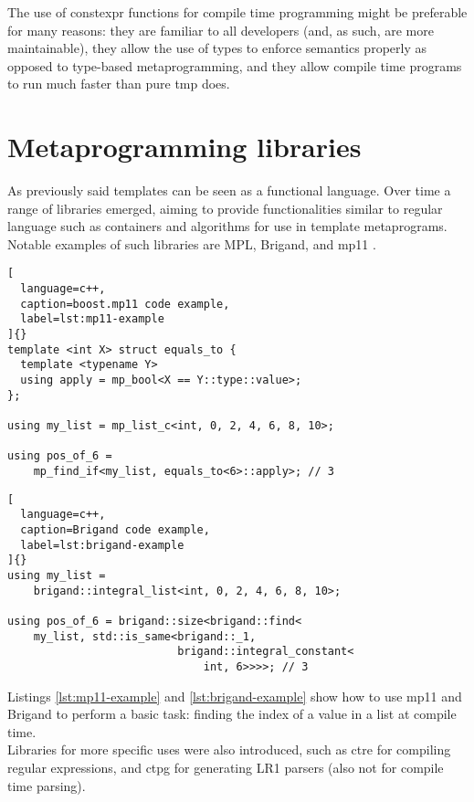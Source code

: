 \documentclass[../main]{subfiles}
\begin{document}
The use of \gls{constexpr} functions for compile time programming might be
preferable for many reasons: they are familiar to all \cpp developers
(and, as such, are more maintainable), they allow the use of types to enforce
semantics properly as opposed to type-based metaprogramming, and they allow
compile time programs to run much faster than pure \gls{tmp} does.

\section{
  Metaprogramming libraries
}
\label{lbl:meta-libraries}

As previously said \cpp templates can be seen as a functional language.
Over time a range of libraries emerged, aiming to provide functionalities
similar to regular language such as containers and algorithms for use in
template metaprograms. Notable examples of such libraries are MPL\cite{mpl},
Brigand\cite{brigand}, and mp11 \cite{mp11}.

\begin{lstlisting}[
  language=c++,
  caption=boost.mp11 code example,
  label=lst:mp11-example
]{}
template <int X> struct equals_to {
  template <typename Y>
  using apply = mp_bool<X == Y::type::value>;
};

using my_list = mp_list_c<int, 0, 2, 4, 6, 8, 10>;

using pos_of_6 =
    mp_find_if<my_list, equals_to<6>::apply>; // 3
\end{lstlisting}

\begin{lstlisting}[
  language=c++,
  caption=Brigand code example,
  label=lst:brigand-example
]{}
using my_list =
    brigand::integral_list<int, 0, 2, 4, 6, 8, 10>;

using pos_of_6 = brigand::size<brigand::find<
    my_list, std::is_same<brigand::_1,
                          brigand::integral_constant<
                              int, 6>>>>; // 3
\end{lstlisting}

Listings \ref{lst:mp11-example} and \ref{lst:brigand-example} show
how to use mp11 and Brigand to perform a basic task: finding the index of a
value in a list at compile time.
\\

Libraries for more specific uses were also introduced, such as
\gls{ctre} \cite{ctre} for compiling regular expressions,
and \gls{ctpg} \cite{ctpg} for generating LR1 parsers
(also not for compile time parsing).
\end{document}
